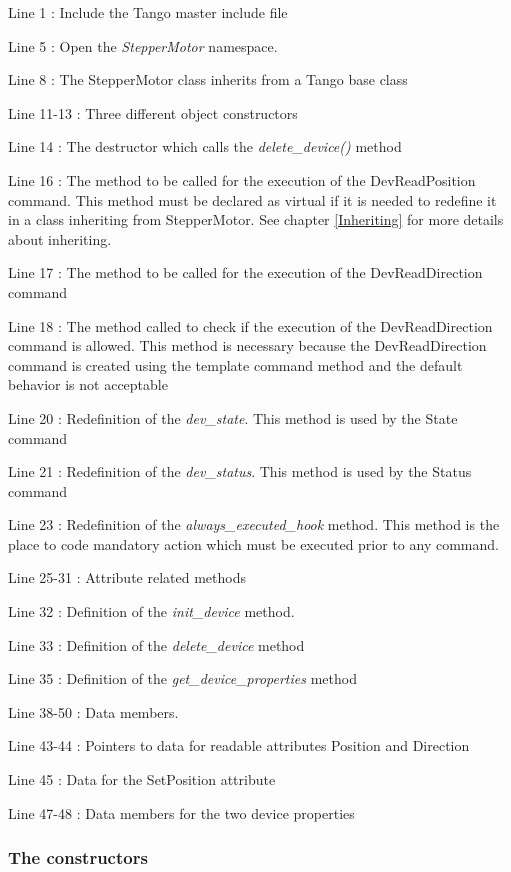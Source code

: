 Line 1 : Include the Tango master include file

Line 5 : Open the \emph{StepperMotor} namespace.

Line 8 : The StepperMotor class inherits from a Tango base class

Line 11-13 : Three different object constructors

Line 14 : The destructor which calls the \emph{delete\_device()} method

Line 16 : The method to be called for the execution of the DevReadPosition
command. This method must be declared as virtual if it is needed to
redefine it in a class inheriting from StepperMotor. See chapter \ref{Inheriting}
for more details about inheriting.

Line 17 : The method to be called for the execution of the DevReadDirection
command

Line 18 : The method called to check if the execution of the DevReadDirection
command is allowed. This method is necessary because the DevReadDirection
command is created using the template command method and the default
behavior is not acceptable

Line 20 : Redefinition of the \emph{dev\_state}.
This method is used by the State command

Line 21 : Redefinition of the \emph{dev\_status}.
This method is used by the Status command

Line 23 : Redefinition of the \emph{always\_executed\_hook}
method. This method is the place to code mandatory action which must
be executed prior to any command.

Line 25-31 : Attribute related methods

Line 32 : Definition of the \emph{init\_device}
method.

Line 33 : Definition of the \emph{delete\_device}
method

Line 35 : Definition of the \emph{get\_device\_properties} method

Line 38-50 : Data members. 

Line 43-44 : Pointers to data for readable attributes Position and
Direction

Line 45 : Data for the SetPosition attribute

Line 47-48 : Data members for the two device properties


\subsubsection{The constructors}

